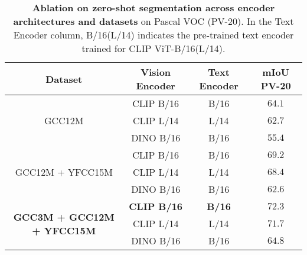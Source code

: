 \documentclass[10pt,twocolumn,letterpaper]{article}
\begin{document}
\begin{table}[!t]
    \centering
    \scriptsize
    \resizebox{0.8\linewidth}{!}
    {
    \begin{tabular}{cccc}
    \toprule
    \textbf{Dataset} & \textbf{Vision Encoder} & \textbf{Text Encoder} & \textbf{mIoU PV-20} \\
    \midrule
    \multirow{3}{*}{GCC12M} & CLIP B/16 & B/16 & $64.1$ \\
                            & CLIP L/14 & L/14 & $62.7$ \\
                            & DINO B/16 & B/16 & $55.4$ \\
    \midrule
    \multirow{3}{*}{GCC12M + YFCC15M} & CLIP B/16 & B/16 & $69.2$ \\
                                      & CLIP L/14 & L/14 & $68.4$ \\
                                      & DINO B/16 & B/16 & $62.6$ \\
    \midrule
    \multirow{3}{*}{\textbf{GCC3M + GCC12M + YFCC15M}} & \textbf{CLIP B/16} & \textbf{B/16} & $\mathbf{72.3}$ \\
                                              & CLIP L/14 & L/14 & $71.7$ \\
                                              & DINO B/16 & B/16 & $64.8$ \\
    \bottomrule
    \end{tabular}
    }
    \vspace{-2mm}
    \caption{\textbf{Ablation on zero-shot segmentation across encoder architectures and datasets} on Pascal VOC (PV-20). In the Text Encoder column, B/16(L/14) indicates the pre-trained text encoder trained for CLIP ViT-B/16(L/14).}
    \label{table:zeroshot_seg_ablations}
    \vspace{-3mm}
\end{table}
\end{document}
